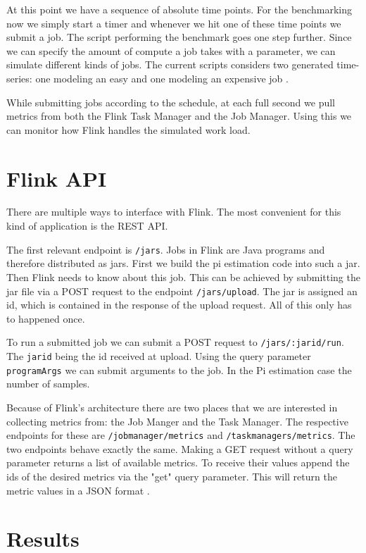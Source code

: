 At this point we have a sequence of absolute time points. For the benchmarking now we simply start a timer and whenever we hit one of these time points we submit a job. The script performing the benchmark goes one step further. Since we can specify the amount of compute a job takes with a parameter, we can simulate different kinds of jobs. The current scripts considers two generated time-series: one modeling an easy and one modeling an expensive job \parencite{flinktest}.

While submitting jobs according to the schedule, at each full second we pull metrics from both the Flink Task Manager and the Job Manager. Using this we can monitor how Flink handles the simulated work load.

\section{Flink API}

There are multiple ways to interface with Flink. The most convenient for this kind of application is the REST API. 

The first relevant endpoint is \texttt{/jars}. Jobs in Flink are Java programs and therefore distributed as jars. First we build the pi estimation code into such a jar. Then Flink needs to know about this job. This can be achieved by submitting the jar file via a POST request to the endpoint \texttt{/jars/upload}. The jar is assigned an id, which is contained in the response of the upload request. All of this only has to happened once. 

To run a submitted job we can submit a POST request to \texttt{/jars/:jarid/run}. The \texttt{jarid} being the id received at upload. Using the query parameter \texttt{programArgs} we can submit arguments to the job. In the Pi estimation case the number of samples. 

Because of Flink's architecture there are two places that we are interested in collecting metrics from: the Job Manger and the Task Manager. The respective endpoints for these are \texttt{/jobmanager/metrics} and \texttt{/taskmanagers/metrics}. The two endpoints behave exactly the same. Making a GET request without a query parameter returns a list of available metrics. To receive their values append the ids of the desired metrics via the "get" query parameter. This will return the metric values in a JSON format \parencite{flinkrest}.

\section{Results}

